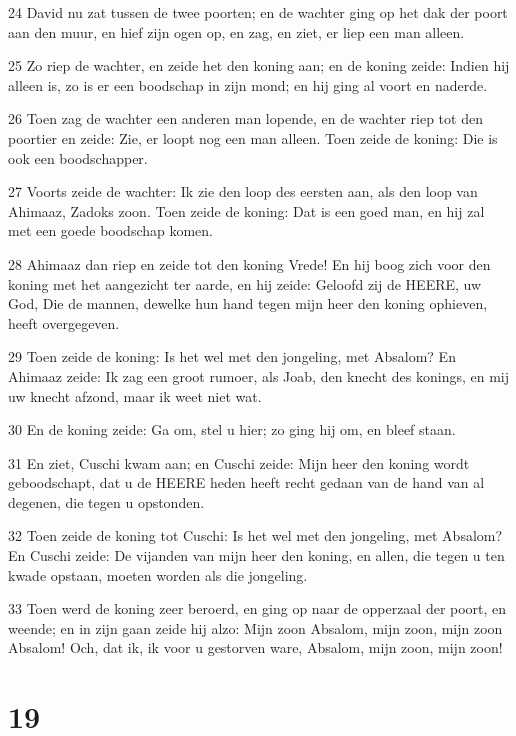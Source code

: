 \par 24 David nu zat tussen de twee poorten; en de wachter ging op het dak der poort aan den muur, en hief zijn ogen op, en zag, en ziet, er liep een man alleen.
\par 25 Zo riep de wachter, en zeide het den koning aan; en de koning zeide: Indien hij alleen is, zo is er een boodschap in zijn mond; en hij ging al voort en naderde.
\par 26 Toen zag de wachter een anderen man lopende, en de wachter riep tot den poortier en zeide: Zie, er loopt nog een man alleen. Toen zeide de koning: Die is ook een boodschapper.
\par 27 Voorts zeide de wachter: Ik zie den loop des eersten aan, als den loop van Ahimaaz, Zadoks zoon. Toen zeide de koning: Dat is een goed man, en hij zal met een goede boodschap komen.
\par 28 Ahimaaz dan riep en zeide tot den koning Vrede! En hij boog zich voor den koning met het aangezicht ter aarde, en hij zeide: Geloofd zij de HEERE, uw God, Die de mannen, dewelke hun hand tegen mijn heer den koning ophieven, heeft overgegeven.
\par 29 Toen zeide de koning: Is het wel met den jongeling, met Absalom? En Ahimaaz zeide: Ik zag een groot rumoer, als Joab, den knecht des konings, en mij uw knecht afzond, maar ik weet niet wat.
\par 30 En de koning zeide: Ga om, stel u hier; zo ging hij om, en bleef staan.
\par 31 En ziet, Cuschi kwam aan; en Cuschi zeide: Mijn heer den koning wordt geboodschapt, dat u de HEERE heden heeft recht gedaan van de hand van al degenen, die tegen u opstonden.
\par 32 Toen zeide de koning tot Cuschi: Is het wel met den jongeling, met Absalom? En Cuschi zeide: De vijanden van mijn heer den koning, en allen, die tegen u ten kwade opstaan, moeten worden als die jongeling.
\par 33 Toen werd de koning zeer beroerd, en ging op naar de opperzaal der poort, en weende; en in zijn gaan zeide hij alzo: Mijn zoon Absalom, mijn zoon, mijn zoon Absalom! Och, dat ik, ik voor u gestorven ware, Absalom, mijn zoon, mijn zoon!

\chapter{19}

